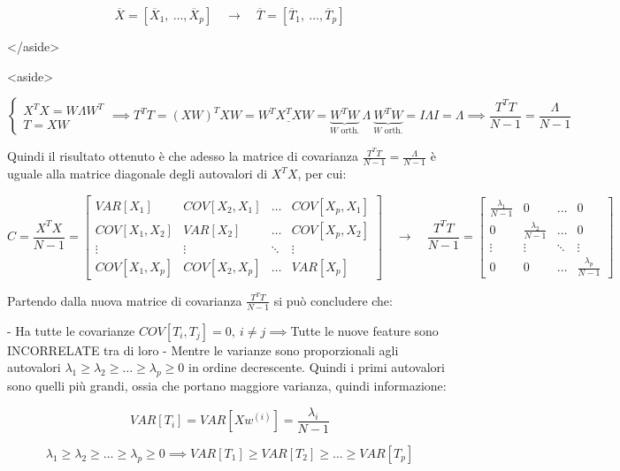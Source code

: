 $$
\overline{X}=\left[\overline{X}_1,\ \dots, \overline{X}_p\right] \quad\rightarrow\quad \overline{T}=\left[\overline{T}_1,\ \dots, \overline{T}_p\right]
$$

</aside>

<aside>


$$
\begin{cases}X^TX=W\Lambda W^T\\
	T=XW\end{cases}\implies
T^TT=(XW)^TXW=W^T\underline{X^TX}W=\underbrace{W^TW}_{W\text{ orth.}}\ \Lambda\ \underbrace{W^TW}_{W\text{ orth.}}=I\Lambda I=\Lambda\implies \frac{T^TT}{N-1}=\frac{\Lambda}{N-1}
$$

Quindi il risultato ottenuto è che adesso la matrice di covarianza $\frac{T^TT}{N-1}=\frac{\Lambda}{N-1}$ è uguale alla matrice diagonale degli autovalori di $X^TX$, per cui:

$$
C=\frac{X^TX}{N-1}=\begin{bmatrix}
	VAR[X_1] & COV[X_2,X_1] & \dots & COV[X_p,X_1] \\
	COV[X_1,X_2] & VAR[X_2] & \dots & COV[X_p,X_2]\\
	\vdots & \vdots & \ddots & \vdots \\
	COV[X_1,X_p] & COV[X_2,X_p] & \dots & VAR[X_p]
\end{bmatrix}

\quad\rightarrow\quad

\frac{T^TT}{N-1}=\begin{bmatrix}
	\frac{\lambda_1}{N-1} & 0 & \dots & 0 \\
	0 & \frac{\lambda_2}{N-1} & \dots & 0\\
	\vdots & \vdots & \ddots & \vdots \\
	0 & 0 & \dots & \frac{\lambda_p}{N-1}
\end{bmatrix}
$$

Partendo dalla nuova matrice di covarianza $\frac{T^TT}{N-1}$ si può concludere che:

- Ha tutte le covarianze $COV[T_i,T_j]=0,\ i\ne j\implies$Tutte le nuove feature sono INCORRELATE tra di loro
- Mentre le varianze sono proporzionali agli autovalori $\lambda_1 \ge \lambda_2 \ge \dots \ge \lambda_p \ge 0$ in ordine decrescente. Quindi i primi autovalori sono quelli più grandi, ossia che portano maggiore varianza, quindi informazione:

$$
VAR[T_i]=VAR[Xw^{(i)}]=\frac{\lambda_i}{N-1}
$$

$$
\lambda_1 \ge \lambda_2 \ge \dots \ge \lambda_p \ge 0\implies VAR[T_1]\ge VAR[T_2]\ge \ldots\ge VAR[T_p]
$$

